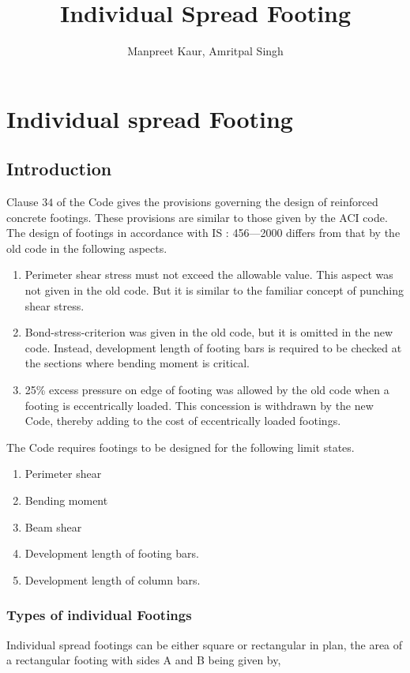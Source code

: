\documentclass{book}
\title{Individual Spread Footing}
\author{Manpreet Kaur, Amritpal Singh}
\begin{document}
\chapter{Individual spread Footing}
\section{Introduction}
Clause $34$ of the Code gives the provisions governing the design of reinforced concrete footings. These provisions are similar to those given by the ACI code. The design of footings in accordance with IS : 456—2000 differs from that by the old code in the following aspects.
\begin{enumerate}
\item Perimeter shear stress must not exceed the allowable value. This aspect was not
given in the old code. But it is similar to the familiar concept of punching shear
stress.

\item Bond-stress-criterion was given in the old code, but it is omitted in the new code.
Instead, development length of footing bars is required to be checked at the sections
where bending moment is critical.

\item 25\% excess pressure on edge of footing was allowed by the old code when a footing
 is eccentrically loaded. This concession is withdrawn by the new Code, thereby
adding to the cost of eccentrically loaded footings.
\end{enumerate}

The Code requires footings to be designed for the following limit states.

\begin{enumerate}
\item Perimeter shear
\item Bending moment
\item Beam shear
\item  Development length of footing bars.
\item Development length of column bars.
\end{enumerate}

\subsection{Types of individual Footings}
Individual spread footings can be either square or rectangular in plan, the area of a rectangular footing with sides A and B being given by,
\end{document}
